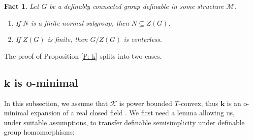 \documentclass[11pt]{amsart}
\newtheorem{fact}[theorem]{Fact}
\theoremstyle{definition}
\newcommand{\bk}{\textbf{k}}
\newcommand{\CK}{{\mathcal K}}
\newcommand{\CM}{{\mathcal M}}
\newcommand{\0}{\emptyset}
\begin{document}
\begin{fact}\cite[Fact 2.11]{PePiSt}\label{F:finite center, centerless}
    Let $G$ be a definably connected group definable in some structure $\CM$.
    \begin{enumerate}
        \item If $N$ is a finite normal subgroup, then $N\subseteq Z(G)$.
        \item If $Z(G)$ is finite, then $G/Z(G)$ is centerless.
    \end{enumerate}
\end{fact}

The proof of Proposition \ref{P: k} splits into two cases.

\subsection{$\bk$ is o-minimal}

In this subsection, we assume that $\CK$ is power bounded $T$-convex, thus $\bk$ is an  o-minimal expansion of a real closed field \cite[Theorem A]{vdDries-Tconvex}.
We first need a lemma allowing us, under suitable assumptions, to transfer definable semisimplicity under definable group homomorphisms: 
\end{document}
